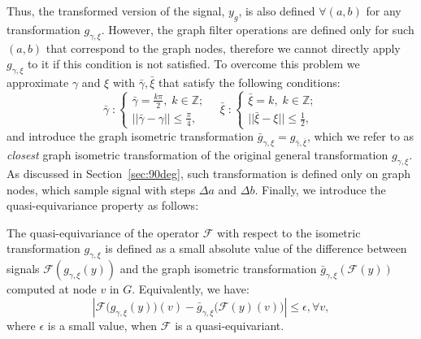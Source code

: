 \documentclass[10pt,journal,compsoc]{IEEEtran}
\newcommand{\renata}[1]{\textcolor{black}{#1}}
\newcommand{\mF}{\mathcal{F}}
\begin{document}
	Thus, the transformed version of the signal, $y_g$, is also defined $\forall (a,b)$ for any transformation $g_{\gamma,\xi}$. However, the graph filter operations are defined only for such $(a,b)$ that correspond to the graph nodes, therefore we cannot directly apply $g_{\gamma,\xi}$ to it if this condition is not satisfied. To overcome this problem we approximate $\gamma$ and $\xi$ with $\bar{\gamma}, \bar{\xi}$ that satisfy the following conditions:
	\begin{equation}
	\bar{\gamma} \; :
	\begin{cases}
	\bar{\gamma} = \frac{k\pi}{2},\; k \in \mathbb{Z}; \\
	||\bar{\gamma} - \gamma || \leq \frac{\pi}{4},
	\end{cases} \quad
	\bar{\xi} \; :
	\begin{cases}
	\bar{\xi} = k,\; k \in \mathbb{Z}; \\
	||\bar{\xi} - \xi || \leq \frac{1}{2},
	\end{cases}
	\end{equation}
	\noindent
	and introduce the graph isometric transformation $\bar{g}_{\gamma, \xi} = g_{\bar{\gamma}, \bar{\xi}}$, which we refer to as \emph{closest} graph isometric transformation of the original general transformation $g_{\gamma, \xi}$.
	As discussed in Section~\ref{sec:90deg}, such transformation is defined only on graph nodes, which sample signal with steps $\Delta a$ and $\Delta b$. Finally, we introduce the quasi-equivariance property  as follows:
	\begin{mydef}
		The quasi-equivariance of the operator $\mF$ with respect to the isometric transformation $g_{\gamma,\xi}$ is defined as a small absolute value of the difference between signals $\mathcal{F}(g_{\gamma,\xi} (y))$ and the graph isometric transformation $\bar{g}_{\gamma,\xi}(\mathcal{F}(y))$ computed at node $v$ in $G$. Equivalently, we have:
		\begin{equation}
		\left| \mathcal{F}\big(g_{\gamma,\xi} (y)\big)(v) - \bar{g}_{\gamma,\xi} \big(\mathcal{F}(y)(v)\big) \right|  \leq \epsilon, \forall v,
		\label{eq:equivariance_ref}
		\end{equation}
		\noindent
		where $\epsilon$ is a small value, when $\mathcal{F}$ is a quasi-equivariant.
	\end{mydef}
\end{document}

